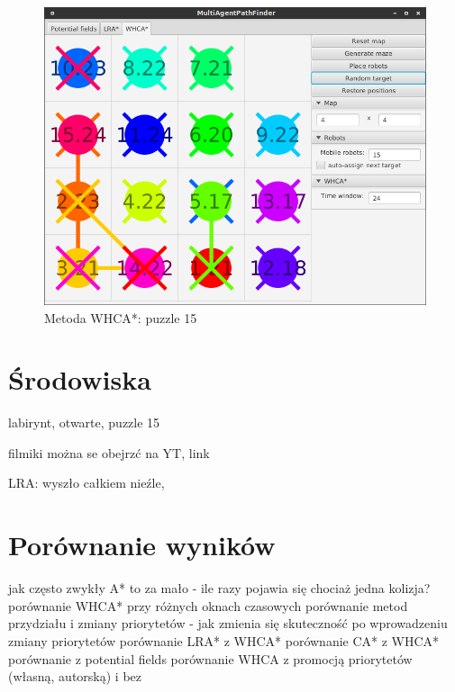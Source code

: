 \begin{figure}
	\centering
	\includegraphics[width=0.8\columnwidth]{img/robopath/puzzle-15}
	\caption{Metoda WHCA*: puzzle 15}
	\label{fig:app-tech-intellij}
\end{figure}

\section{Środowiska}
labirynt, otwarte, puzzle 15

filmiki można se obejrzć na YT, link

LRA: wyszło całkiem nieźle,

\section{Porównanie wyników}
jak często zwykły A* to za mało - ile razy pojawia się chociaż jedna kolizja?
porównanie WHCA* przy różnych oknach czasowych
porównanie metod przydziału i zmiany priorytetów - jak zmienia się skuteczność  po wprowadzeniu zmiany priorytetów
porównanie LRA* z WHCA*
porównanie CA* z WHCA*
porównanie z potential fields
porównanie WHCA z promocją priorytetów (własną, autorską) i bez
